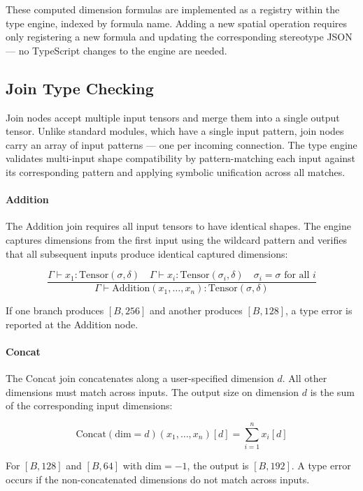 \documentclass[11pt,a4paper]{article}
\begin{document}
These computed dimension formulas are implemented as a registry within the type engine, indexed by formula name. Adding a new spatial operation requires only registering a new formula and updating the corresponding stereotype JSON --- no TypeScript changes to the engine are needed.

\subsection{Join Type Checking}

Join nodes accept multiple input tensors and merge them into a single output tensor. Unlike standard modules, which have a single input pattern, join nodes carry an array of input patterns --- one per incoming connection. The type engine validates multi-input shape compatibility by pattern-matching each input against its corresponding pattern and applying symbolic unification across all matches.

\paragraph{Addition}

The Addition join requires all input tensors to have identical shapes. The engine captures dimensions from the first input using the wildcard pattern and verifies that all subsequent inputs produce identical captured dimensions:

\[
\frac{
\Gamma \vdash x_1 : \text{Tensor}(\sigma, \delta) \quad
\Gamma \vdash x_i : \text{Tensor}(\sigma_i, \delta) \quad
\sigma_i = \sigma \text{ for all } i
}{
\Gamma \vdash \text{Addition}(x_1, \ldots, x_n) : \text{Tensor}(\sigma, \delta)
}
\]

If one branch produces $[B, 256]$ and another produces $[B, 128]$, a type error is reported at the Addition node.

\paragraph{Concat}

The Concat join concatenates along a user-specified dimension $d$. All other dimensions must match across inputs. The output size on dimension $d$ is the sum of the corresponding input dimensions:

\[
\text{Concat}(\text{dim}=d)(x_1, \ldots, x_n)[d] = \sum_{i=1}^n x_i[d]
\]

For $[B, 128]$ and $[B, 64]$ with $\text{dim}=-1$, the output is $[B, 192]$. A type error occurs if the non-concatenated dimensions do not match across inputs.
\end{document}
